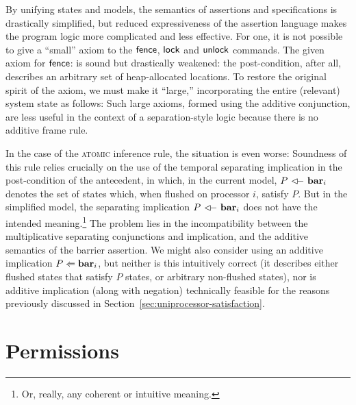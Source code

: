 \documentclass[11pt]{report}
\begin{document}
By unifying states and models, the semantics of assertions and specifications is drastically simplified, but reduced expressiveness of the assertion language makes the program logic more complicated and less effective. For one, it is not possible to give a ``small'' axiom to the $\operatorname{\mathsf{fence}}$, $\operatorname{\mathsf{lock}}$ and $\operatorname{\mathsf{unlock}}$ commands. The given axiom for $\operatorname{\mathsf{fence}}$:  is sound but drastically weakened: the post-condition, after all, describes an arbitrary set of heap-allocated locations. To restore the original spirit of the axiom, we must make it ``large,'' incorporating the entire (relevant) system state as follows:  Such large axioms, formed using the additive conjunction, are less useful in the context of a separation-style logic because there is no additive frame rule. 

In the case of the \textsc{atomic} inference rule, the situation is even worse:  Soundness of this rule relies crucially on the use of the temporal separating implication in the post-condition of the antecedent, in which, in the current model, $P \fseqri \fbar{i}$ denotes the set of states which, when flushed on processor $i$, satisfy $P$. But in the simplified model, the separating implication $P \fseqri \fbar{i}$ does not have the intended meaning.\footnote{Or, really, any coherent or intuitive meaning.} The problem lies in the  incompatibility between the multiplicative separating conjunctions and implication, and the additive semantics of the barrier assertion. We might also consider using an additive implication $P \Leftarrow \mathbf{bar}_{i}$, but neither is this intuitively correct (it describes either flushed states that satisfy $P$ states, or arbitrary non-flushed states), nor is additive implication (along with negation) technically feasible for the reasons previously discussed in Section~\ref{sec:uniprocessor-satisfaction}. 


\section{Permissions} 
\label{sec:splitting-permissions}
\end{document}
